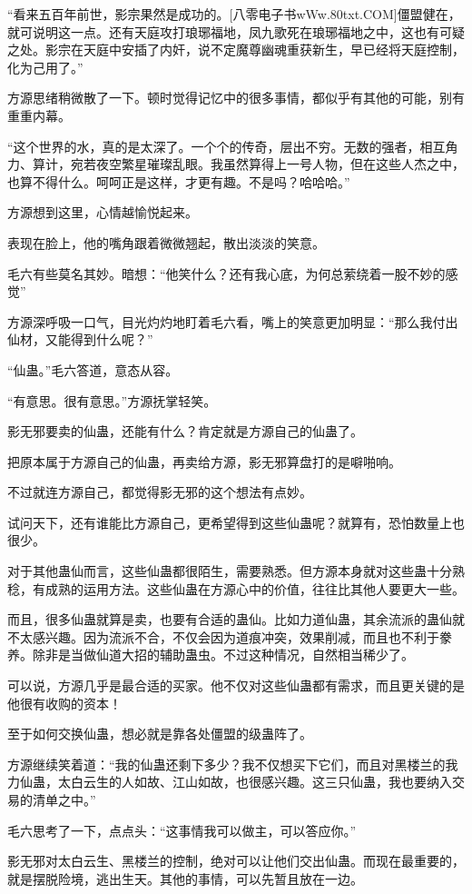 \begin{this_body}
“看来五百年前世，影宗果然是成功的。[八零电子书wWw.80txt.COM]僵盟健在，就可说明这一点。还有天庭攻打琅琊福地，凤九歌死在琅琊福地之中，这也有可疑之处。影宗在天庭中安插了内奸，说不定魔尊幽魂重获新生，早已经将天庭控制，化为己用了。”

方源思绪稍微散了一下。顿时觉得记忆中的很多事情，都似乎有其他的可能，别有重重内幕。

“这个世界的水，真的是太深了。一个个的传奇，层出不穷。无数的强者，相互角力、算计，宛若夜空繁星璀璨乱眼。我虽然算得上一号人物，但在这些人杰之中，也算不得什么。呵呵正是这样，才更有趣。不是吗？哈哈哈。”

方源想到这里，心情越愉悦起来。

表现在脸上，他的嘴角跟着微微翘起，散出淡淡的笑意。

毛六有些莫名其妙。暗想：“他笑什么？还有我心底，为何总萦绕着一股不妙的感觉”

方源深呼吸一口气，目光灼灼地盯着毛六看，嘴上的笑意更加明显：“那么我付出仙材，又能得到什么呢？”

“仙蛊。”毛六答道，意态从容。

“有意思。很有意思。”方源抚掌轻笑。

影无邪要卖的仙蛊，还能有什么？肯定就是方源自己的仙蛊了。

把原本属于方源自己的仙蛊，再卖给方源，影无邪算盘打的是噼啪响。

不过就连方源自己，都觉得影无邪的这个想法有点妙。

试问天下，还有谁能比方源自己，更希望得到这些仙蛊呢？就算有，恐怕数量上也很少。

对于其他蛊仙而言，这些仙蛊都很陌生，需要熟悉。但方源本身就对这些蛊十分熟稔，有成熟的运用方法。这些仙蛊在方源心中的价值，往往比其他人要更大一些。

而且，很多仙蛊就算是卖，也要有合适的蛊仙。比如力道仙蛊，其余流派的蛊仙就不太感兴趣。因为流派不合，不仅会因为道痕冲突，效果削减，而且也不利于豢养。除非是当做仙道大招的辅助蛊虫。不过这种情况，自然相当稀少了。

可以说，方源几乎是最合适的买家。他不仅对这些仙蛊都有需求，而且更关键的是他很有收购的资本！

至于如何交换仙蛊，想必就是靠各处僵盟的级蛊阵了。

方源继续笑着道：“我的仙蛊还剩下多少？我不仅想买下它们，而且对黑楼兰的我力仙蛊，太白云生的人如故、江山如故，也很感兴趣。这三只仙蛊，我也要纳入交易的清单之中。”

毛六思考了一下，点点头：“这事情我可以做主，可以答应你。”

影无邪对太白云生、黑楼兰的控制，绝对可以让他们交出仙蛊。而现在最重要的，就是摆脱险境，逃出生天。其他的事情，可以先暂且放在一边。


\end{this_body}
